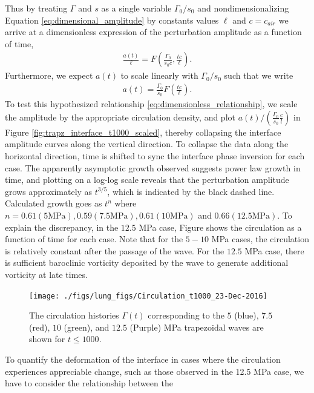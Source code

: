\documentclass{jfm}%
\begin{document}
Thus by treating $\Gamma$ and $s$ as a single variable $\Gamma_0/s_0$
and nondimensionalizing Equation \eqref{eq:dimensional_amplitude} by
constants values $\ell$ and $c=c_{air}$ we arrive at a dimensionless
expression of the perturbation amplitude as a function of time,
%
\begin{align}
  \label{eq:dimensionless_groups}
  \frac{a(t)}{\ell}=F\left(\frac{\Gamma_0}{s_0 c}, \frac{t c}{\ell} \right).
\end{align}
%
Furthermore, we expect $a(t)$ to scale linearly with $\Gamma_0/s_0$
such that we write
%
\begin{align}
  \label{eq:dimensionless_relationship}
  a(t)=\frac{\Gamma_0}{s_0}F\left(\frac{t c}{\ell} \right).
\end{align}
%
To test this hypothesized relationship
\eqref{eq:dimensionless_relationship}, we scale the amplitude by the
appropriate circulation density, and plot
$a(t)/\left(\frac{\Gamma_0}{s_0}\frac{c}{l}\right)$ in Figure
\ref{fig:trapz_interface_t1000_scaled}, thereby collapsing the
interface amplitude curves along the vertical direction. To collapse
the data along the horizontal direction, time is shifted to sync the
interface phase inversion for each case. The apparently asymptotic
growth observed suggests power law growth in time, and plotting on a
log-log scale reveals that the perturbation amplitude grows
approximately as $t^{3/5}$, which is indicated by the black dashed
line. Calculated growth goes as $t^n$ where
$n=0.61 (5 \text{MPa}), 0.59 (7.5 \text{MPa}), 0.61 (10 \text{MPa})$
and $0.66 (12.5 \text{MPa})$. To explain the discrepancy, in the $12.5$
MPa case, Figure shows the circulation as a function of time for each
case. Note that for the $5-10$ MPa cases, the circulation is
relatively constant after the passage of the wave. For the $12.5$ MPa
case, there is sufficient baroclinic vorticity deposited by the wave
to generate additional vorticity at late times.
%
\begin{figure}
  \centering
  \texttt{[image: ./figs/lung\_figs/Circulation\_t1000\_23-Dec-2016]}
  \caption[The circulation long time]{The circulation histories
    $\Gamma(t)$ corresponding to the $5$ (blue), $7.5$ (red), $10$
    (green), and $12.5$ (Purple) MPa trapezoidal waves are shown for
    $t\leq 1000$. }
  \label{fig:trapz_circ_t1000}
\end{figure}
%
To quantify the deformation of the interface in cases where the
circulation experiences appreciable change, such as those observed in
the 12.5 MPa case, we have to consider the relationship between the
\end{document}
